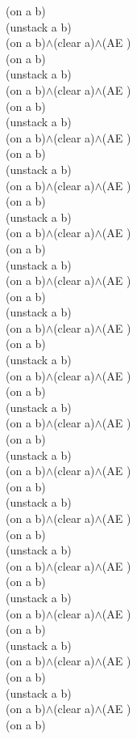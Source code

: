 {{(on a b)\\
(unstack a b)\\
(on a b)$\wedge$(clear a)$\wedge$(AE )\\
(on a b)\\
(unstack a b)\\
(on a b)$\wedge$(clear a)$\wedge$(AE )\\
(on a b)\\
(unstack a b)\\
(on a b)$\wedge$(clear a)$\wedge$(AE )\\
(on a b)\\
(unstack a b)\\
(on a b)$\wedge$(clear a)$\wedge$(AE )\\
(on a b)\\
(unstack a b)\\
(on a b)$\wedge$(clear a)$\wedge$(AE )\\
(on a b)\\
(unstack a b)\\
(on a b)$\wedge$(clear a)$\wedge$(AE )\\
(on a b)\\
(unstack a b)\\
(on a b)$\wedge$(clear a)$\wedge$(AE )\\
(on a b)\\
(unstack a b)\\
(on a b)$\wedge$(clear a)$\wedge$(AE )\\
(on a b)\\
(unstack a b)\\
(on a b)$\wedge$(clear a)$\wedge$(AE )\\
(on a b)\\
(unstack a b)\\
(on a b)$\wedge$(clear a)$\wedge$(AE )\\
(on a b)\\
(unstack a b)\\
(on a b)$\wedge$(clear a)$\wedge$(AE )\\
(on a b)\\
(unstack a b)\\
(on a b)$\wedge$(clear a)$\wedge$(AE )\\
(on a b)\\
(unstack a b)\\
(on a b)$\wedge$(clear a)$\wedge$(AE )\\
(on a b)\\
(unstack a b)\\
(on a b)$\wedge$(clear a)$\wedge$(AE )\\
(on a b)\\
(unstack a b)\\
(on a b)$\wedge$(clear a)$\wedge$(AE )\\
(on a b)\\
}%
}

